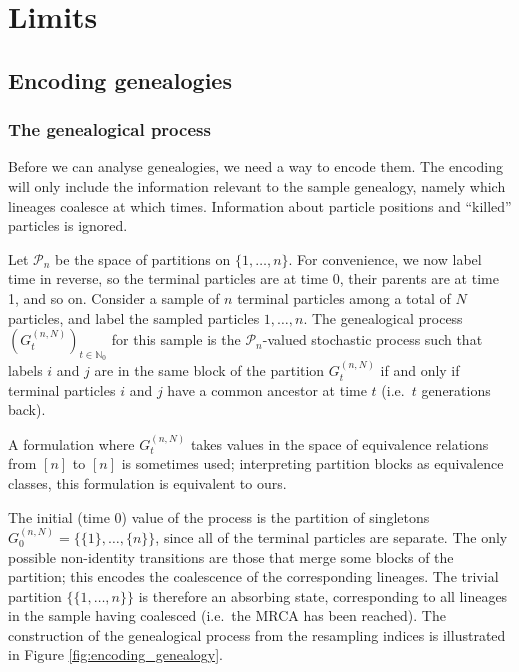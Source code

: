 \chapter{Limits}


\section{Encoding genealogies \seb{$\sim$} }

\subsection{The genealogical process \seb{$\checkmark$} }
Before we can analyse genealogies, we need a way to encode them.
The encoding will only include the information relevant to the sample genealogy, namely which lineages coalesce at which times. Information about particle positions and ``killed'' particles is ignored.

Let $\mathcal{P}_n$ be the space of partitions on $\{1,\dots,n\}$.
For convenience, we now label time in reverse, so the terminal particles are at time 0, their parents are at time 1, and so on.
Consider a sample of $n$ terminal particles among a total of $N$ particles, and label the sampled particles $1,\dots,n$.
The genealogical process $(G_t^{(n,N)})_{t\in\mathbb{N}_0}$ for this sample is the $\mathcal{P}_n$-valued stochastic process such that labels $i$ and $j$ are in the same block of the partition $G_t^{(n,N)}$ if and only if terminal particles $i$ and $j$ have a common ancestor at time $t$ (i.e.\ $t$ generations back).

A formulation where $G_t^{(n,N)}$ takes values in the space of equivalence relations from $[n]$ to $[n]$ is sometimes used; interpreting partition blocks as equivalence classes, this formulation is equivalent to ours.

The initial (time 0) value of the process is the partition of singletons $G_0^{(n,N)} = \{ \{1\}, \dots, \{n\} \}$, since all of the terminal particles are separate.
The only possible non-identity transitions are those that merge some blocks of the partition; this encodes the coalescence of the corresponding lineages.
The trivial partition $\{ \{1,\dots,n\} \}$ is therefore an absorbing state, corresponding to all lineages in the sample having coalesced (i.e.\ the MRCA has been reached).
The construction of the genealogical process from the resampling indices is illustrated in Figure \ref{fig:encoding_genealogy}.

